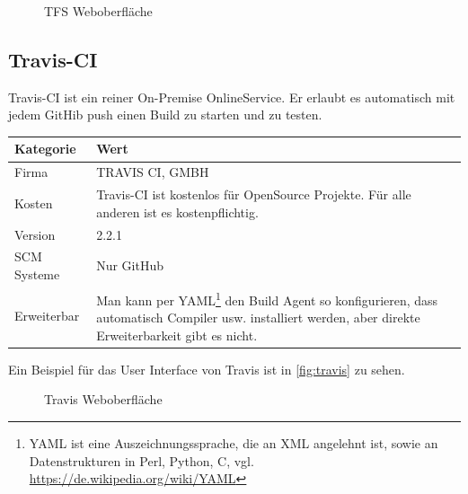 \begin{figure}[H]
  \centering
  \caption{TFS Weboberfläche \cite{TFS-Marketing}}\label{fig:tfs_release_pipeline}
\end{figure}
\subsection{Travis-CI}
Travis-CI ist ein reiner On-Premise OnlineService. Er erlaubt es automatisch mit jedem GitHib push einen Build zu starten und zu testen.
\begin{center}
  \begin{tabularx}{\textwidth}{lX}
    \toprule
    Kategorie & Wert \\
    \midrule
    Firma &  TRAVIS CI, GMBH \\
		\addlinespace
    Kosten & Travis-CI ist kostenlos für OpenSource Projekte. Für alle anderen ist es kostenpflichtig.\\
		\addlinespace
		Version & 2.2.1 \\
		\addlinespace
		SCM Systeme & Nur GitHub\\
		\addlinespace
		Erweiterbar & Man kann per YAML\footnote{YAML ist eine Auszeichnungssprache, die an XML angelehnt ist, sowie an Datenstrukturen in Perl, Python, C, vgl. \url{https://de.wikipedia.org/wiki/YAML}} den Build Agent so konfigurieren, dass automatisch Compiler usw. installiert werden, aber direkte Erweiterbarkeit gibt es nicht.\\
    \bottomrule
  \end{tabularx}
\end{center}
Ein Beispiel für das User Interface von Travis ist in \autoref{fig:travis} zu sehen. 

\begin{figure}[H]
  \centering
  \caption{Travis Weboberfläche \cite{Travis-build}}\label{fig:travis}
\end{figure}